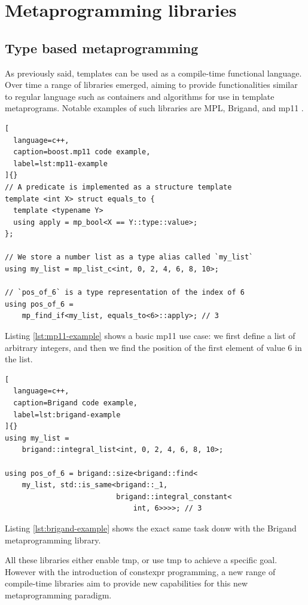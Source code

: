 \documentclass[../main]{subfiles}
\begin{document}
\section{
  Metaprogramming libraries
}
\label{lbl:meta-libraries}

\subsection{
  Type based metaprogramming
}

As previously said, \cpp templates can be used as a compile-time
functional language. Over time a range of libraries emerged, aiming to provide
functionalities similar to regular language such as containers and algorithms
for use in template metaprograms. Notable examples of such libraries are
MPL\cite{mpl}, Brigand\cite{brigand}, and mp11 \cite{mp11}.

\begin{lstlisting}[
  language=c++,
  caption=boost.mp11 code example,
  label=lst:mp11-example
]{}
// A predicate is implemented as a structure template
template <int X> struct equals_to {
  template <typename Y>
  using apply = mp_bool<X == Y::type::value>;
};

// We store a number list as a type alias called `my_list`
using my_list = mp_list_c<int, 0, 2, 4, 6, 8, 10>;

// `pos_of_6` is a type representation of the index of 6
using pos_of_6 =
    mp_find_if<my_list, equals_to<6>::apply>; // 3
\end{lstlisting}

Listing \ref{lst:mp11-example} shows a basic mp11 use case: we first define a
list of arbitrary integers, and then we find the position of the first element
of value 6 in the list.

\begin{lstlisting}[
  language=c++,
  caption=Brigand code example,
  label=lst:brigand-example
]{}
using my_list =
    brigand::integral_list<int, 0, 2, 4, 6, 8, 10>;

using pos_of_6 = brigand::size<brigand::find<
    my_list, std::is_same<brigand::_1,
                          brigand::integral_constant<
                              int, 6>>>>; // 3
\end{lstlisting}

Listing \ref{lst:brigand-example} shows the exact same task donw with the
Brigand metaprogramming library.

All these libraries either enable \gls{tmp}, or use \gls{tmp} to achieve
a specific goal. However with the introduction of \gls{constexpr} programming,
a new range of compile-time libraries aim to provide new capabilities
for this new metaprogramming paradigm.
\end{document}
